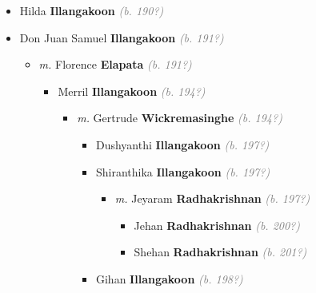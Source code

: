 \documentclass[10pt, openany]{book}
\begin{document}
\begin{itemize}
{\begin{itemize}
{\begin{itemize}
{\begin{itemize}
{\begin{itemize}
{\begin{itemize}
\item{Yenushka \textbf{Illangakoon} \textcolor{gray}{\textit{(b. 198?)}}
 }
\item{Yovaan \textbf{Illangakoon} \textcolor{gray}{\textit{(b. 198?)}}
 }
\end{itemize}}
\end{itemize}
  }
\end{itemize}}
\end{itemize}
  }
\item{Hilda \textbf{Illangakoon} \textcolor{gray}{\textit{(b. 190?)}}
 }
\item{Don Juan Samuel  \textbf{Illangakoon} \textcolor{gray}{\textit{(b. 191?)}}
\begin{itemize}
\item{\textit{m.} Florence \textbf{Elapata} \textcolor{gray}{\textit{(b. 191?)}}   \label{couple:00001437:00001438} \begin{itemize}
\item{Merril \textbf{Illangakoon} \textcolor{gray}{\textit{(b. 194?)}}
\begin{itemize}
\item{\textit{m.} Gertrude \textbf{Wickremasinghe} \textcolor{gray}{\textit{(b. 194?)}}   \label{couple:00001449:00001450} \begin{itemize}
\item{Dushyanthi \textbf{Illangakoon} \textcolor{gray}{\textit{(b. 197?)}}
 }
\item{Shiranthika \textbf{Illangakoon} \textcolor{gray}{\textit{(b. 197?)}}
\begin{itemize}
\item{\textit{m.} Jeyaram \textbf{Radhakrishnan} \textcolor{gray}{\textit{(b. 197?)}}   \label{couple:00001455:00001456} \begin{itemize}
\item{Jehan \textbf{Radhakrishnan} \textcolor{gray}{\textit{(b. 200?)}}
 }
\item{Shehan \textbf{Radhakrishnan} \textcolor{gray}{\textit{(b. 201?)}}
 }
\end{itemize}}
\end{itemize}
 }
\item{Gihan \textbf{Illangakoon} \textcolor{gray}{\textit{(b. 198?)}}
}
\end{itemize}}
\end{itemize}}
\end{itemize}}
\end{itemize}}
\end{itemize}}
\end{itemize}
\end{document}
